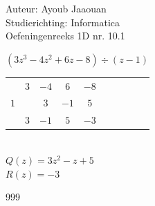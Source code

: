 \documentclass[a4paper]{article}
\begin{document}
  
\noindent \large Auteur: Ayoub Jaaouan          \\
\noindent \large Studierichting: Informatica   \\ 
\noindent \large Oefeningenreeks 1D nr. 10.1   \\

\medskip

\normalsize



$(3z^3-4z^2+6z-8)\div(z-1)$ \\


\begin{tabular}{c|ccccccccc}
		& $3$ & $-4$ & $6$ & $-8$ \\
$1$ 	&     & $3$ & $-1$ & $5$  \\ \hline
		& $3$ & $-1$ & $5$& \vline $ -3$ \\
\end{tabular}\\

$Q(z) = 3z^2-z+5$ \\

$R(z) = -3$ \\






\begin{thebibliography}{999}
\end{thebibliography}
\end{document}
